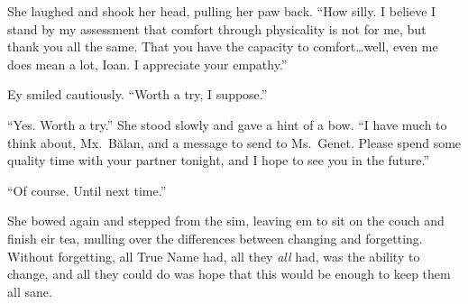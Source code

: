 She laughed and shook her head, pulling her paw back. ``How silly. I believe I stand by my assessment that comfort through physicality is not for me, but thank you all the same. That you have the capacity to comfort\ldots{}well, even me does mean a lot, Ioan. I appreciate your empathy.''

Ey smiled cautiously. ``Worth a try, I suppose.''

``Yes. Worth a try.'' She stood slowly and gave a hint of a bow. ``I have much to think about, Mx.~Bălan, and a message to send to Ms.~Genet. Please spend some quality time with your partner tonight, and I hope to see you in the future.''

``Of course. Until next time.''

She bowed again and stepped from the sim, leaving em to sit on the couch and finish eir tea, mulling over the differences between changing and forgetting. Without forgetting, all True Name had, all they \emph{all} had, was the ability to change, and all they could do was hope that this would be enough to keep them all sane.
